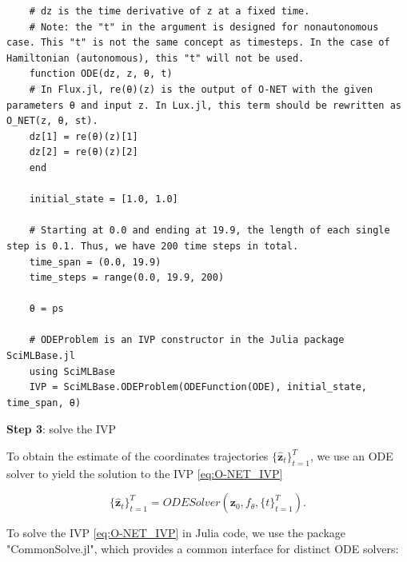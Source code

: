 \documentclass[
	parskip, 			   %
	twoside, 			   %
	DIV=14, 			   %
	BCOR=15.0mm, 		   %
	headsepline, 		   %
	open=right, 		   %
	captions=tableheading, %
	bibliography=totoc,    %
	numbers=noenddot       %
]{scrreprt}
\begin{document}
\begin{verbatim}
    # dz is the time derivative of z at a fixed time.
    # Note: the "t" in the argument is designed for nonautonomous case. This "t" is not the same concept as timesteps. In the case of Hamiltonian (autonomous), this "t" will not be used.
    function ODE(dz, z, θ, t)
    # In Flux.jl, re(θ)(z) is the output of O-NET with the given parameters θ and input z. In Lux.jl, this term should be rewritten as O_NET(z, θ, st).
    dz[1] = re(θ)(z)[1]
    dz[2] = re(θ)(z)[2]
    end
    
    initial_state = [1.0, 1.0]
    
    # Starting at 0.0 and ending at 19.9, the length of each single step is 0.1. Thus, we have 200 time steps in total.
    time_span = (0.0, 19.9)
    time_steps = range(0.0, 19.9, 200)
    
    θ = ps
    
    # ODEProblem is an IVP constructor in the Julia package SciMLBase.jl
    using SciMLBase
    IVP = SciMLBase.ODEProblem(ODEFunction(ODE), initial_state, time_span, θ)
\end{verbatim}

\textbf{Step 3}: solve the IVP

To obtain the estimate of the coordinates trajectories $\{ \mathbf{\hat{z}}_{t} \}_{t=1}^{T}$, we use an ODE solver to yield the solution to the IVP \ref{eq:O-NET_IVP}

\begin{equation}
    \label{eq:O-NET_ODESolver}
    \{ \mathbf{\hat{z}}_{t} \}_{t=1}^{T} = ODESolver(\mathbf{z}_{0}, f_{\theta}, \{ t \}_{t=1}^{T}).
\end{equation}

To solve the IVP \ref{eq:O-NET_IVP} in Julia code, we use the package "CommonSolve.jl", which provides a common interface for distinct ODE solvers:
\end{document}
